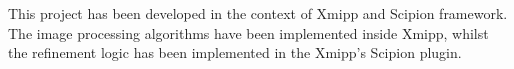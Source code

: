 \documentclass[../main.tex]{subfiles}
\begin{document}
This project has been developed in the context of Xmipp and Scipion framework. The image processing algorithms have been implemented inside Xmipp, whilst the refinement logic has been implemented in the Xmipp's Scipion plugin.
\end{document}
